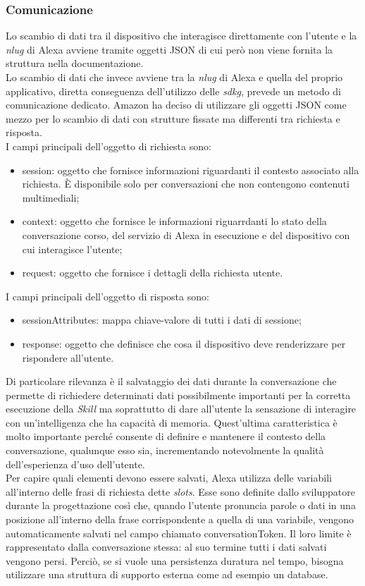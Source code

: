		\subsubsection{Comunicazione}
		Lo scambio di dati tra il dispositivo che interagisce direttamente con l'utente e la \emph{\gls{nlug}} di Alexa avviene tramite oggetti JSON di cui però non viene fornita la struttura nella documentazione. \\
		Lo scambio di dati che invece avviene tra la \emph{\gls{nlug}} di Alexa e quella del proprio applicativo, diretta conseguenza dell'utilizzo delle \emph{\gls{sdkg}}, prevede un metodo di comunicazione dedicato. Amazon ha deciso di utilizzare gli oggetti JSON come mezzo per lo scambio di dati con strutture fissate ma differenti tra richiesta e risposta. \\
		I campi principali dell'oggetto di richiesta sono:
		\begin{itemize}
			\item session: oggetto che fornisce informazioni riguardanti il contesto associato alla richiesta. È disponibile solo per conversazioni che non contengono contenuti multimediali;
			\item context: oggetto che fornisce le informazioni riguarrdanti lo stato della conversazione corso, del servizio di Alexa in esecuzione e del dispositivo con cui interagisce l'utente;
			\item request: oggetto che fornisce i dettagli della richiesta utente.
		\end{itemize}
		I campi principali dell'oggetto di risposta sono:
		\begin{itemize}
			\item sessionAttributes: mappa chiave-valore di tutti i dati di sessione;
			\item response: oggetto che definisce che cosa il dispositivo deve renderizzare per rispondere all'utente.
		\end{itemize}
		Di particolare rilevanza è il salvataggio dei dati durante la conversazione che permette di richiedere determinati dati possibilmente importanti per la corretta esecuzione della \emph{Skill} ma soprattutto di dare all'utente la sensazione di interagire con un'intelligenza che ha capacità di memoria. Quest'ultima caratteristica è molto importante perché consente di definire e mantenere il contesto della conversazione, qualunque esso sia, incrementando notevolmente la qualità dell'esperienza d'uso dell'utente. \\
		Per capire quali elementi devono essere salvati, Alexa utilizza delle variabili all'interno delle frasi di richiesta dette \emph{slots}. Esse sono definite dallo sviluppatore durante la progettazione così che, quando l'utente pronuncia parole o dati in una posizione all'interno della frase corrispondente a quella di una variabile, vengono automaticamente salvati nel campo chiamato conversationToken. Il loro limite è rappresentato dalla conversazione stessa: al suo termine tutti i dati salvati vengono persi. Perciò, se si vuole una persistenza duratura nel tempo, bisogna utilizzare una struttura di supporto esterna come ad esempio un database.
